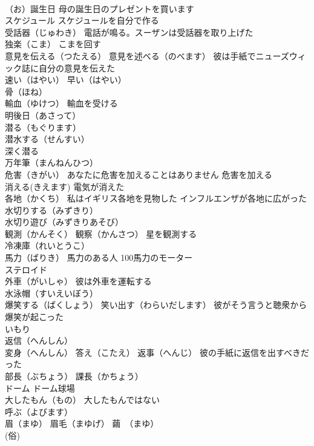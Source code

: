 \documentclass[8pt]{extreport}
\begin{document}
\begin{CJK}{UTF8}{min}
\\	（お）誕生日 母の誕生日のプレゼントを買います
\\	スケジュール スケジュールを自分で作る
\\	受話器（じゅわき） 電話が鳴る。スーザンは受話器を取り上げた
\\	独楽（こま） こまを回す
\\	意見を伝える（つたえる） 意見を述べる（のべます） 彼は手紙でニューズウィック誌に自分の意見を伝えた
\\	速い（はやい） 早い（はやい）
\\	骨（ほね）
\\	輸血（ゆけつ） 輸血を受ける
\\	明後日（あさって）
\\	潜る（もぐります）
\\	潜水する（せんすい）
\\	深く潜る
\\	万年筆（まんねんひつ）
\\	危害（きがい） あなたに危害を加えることはありません 危害を加える
\\	消える(きえます) 電気が消えた
\\	各地（かくち） 私はイギリス各地を見物した インフルエンザが各地に広がった
\\	水切りする（みずきり） 
\\	水切り遊び（みずきりあそび）
\\	観測（かんそく） 観察（かんさつ） 星を観測する
\\	冷凍庫（れいとうこ）
\\	馬力（ばりき） 馬力のある人 100馬力のモーター
\\	ステロイド
\\	外車（がいしゃ） 彼は外車を運転する
\\	水泳帽（すいえいぼう）
\\	爆笑する（ばくしょう） 笑い出す（わらいだします） 彼がそう言うと聴衆から爆笑が起こった
\\	いもり
\\	返信（へんしん） 
\\	変身（へんしん） 答え（こたえ） 返事（へんじ） 彼の手紙に返信を出すべきだった
\\	部長（ぶちょう） 課長（かちょう）
\\	ドーム ドーム球場
\\	大したもん（もの） 大したもんではない
\\	呼ぶ（よびます）
\\	眉（まゆ） 眉毛（まゆげ） 繭　（まゆ）
\\	(俗) 

\end{CJK}
\end{document}
